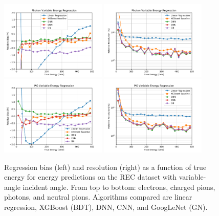 \begin{figure}[htbp]
\includegraphics[width=0.45\textwidth]{Images/Calo/bias_vs_E_Gamma_variable.pdf}
\includegraphics[width=0.45\textwidth]{Images/Calo/res_vs_E_Gamma_variable.pdf}\\
\includegraphics[width=0.45\textwidth]{Images/Calo/bias_vs_E_Pi0_variable.pdf}
\includegraphics[width=0.45\textwidth]{Images/Calo/res_vs_E_Pi0_variable.pdf}
\caption{Regression bias (left) and resolution (right) as a function of true energy for energy predictions on the REC dataset with variable-angle incident angle. From top to bottom: electrons, charged pions, photons, and neutral pions. Algorithms compared are linear regression, XGBoost (BDT), DNN, CNN, and GoogLeNet (GN).\label{fig:reg_dnn_vs_cnn_variable}}
\end{figure}

